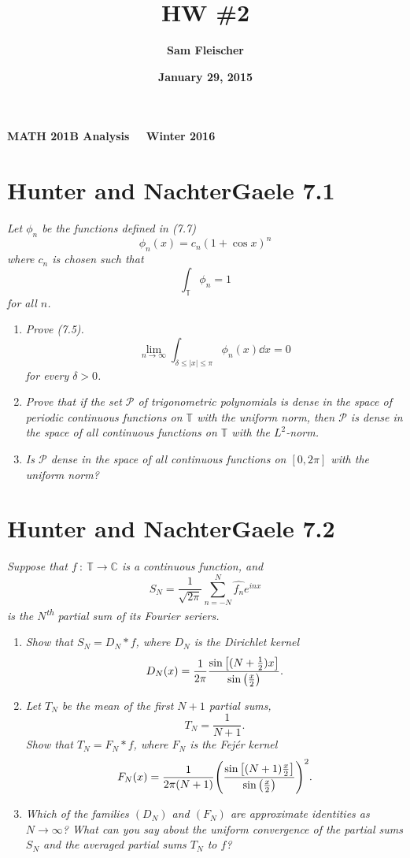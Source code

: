 \documentclass[12pt]{article}
\title{\bf HW \#2}
\author{\bf Sam Fleischer}
\date{\bf January 29, 2015}
\theoremstyle{plain}
\begin{document}
\textbf{MATH 201B \hfill Analysis \ \ \hfill Winter 2016\ \ \ }

{\let\newpage\relax\maketitle}

\section*{Hunter and NachterGaele 7.1}
\emph{Let $\phi_n$ be the functions defined in (7.7) $$\phi_n(x) = c_n(1 + \cos x)^n$$ where $c_n$ is chosen such that $$\int_\mathbb{T}\phi_n = 1$$ for all $n$.}
\begin{enumerate}[ (a)]
    \item
        \emph{Prove (7.5).  $$\lim_{n\rightarrow \infty}\int_{\delta\leq|x|\leq \pi}\phi_n(x) \dd x = 0$$ for every $\delta > 0$.}
    \item
        \emph{Prove that if the set $\mathcal{P}$ of trigonometric polynomials is dense in the space of periodic continuous functions on $\mathbb{T}$ with the uniform norm, then $\mathcal{P}$ is dense in the space of all continuous functions on $\mathbb{T}$ with the $L^2$-norm.}
    \item
        \emph{Is $\mathcal{P}$ dense in the space of all continuous functions on $[0, 2\pi]$ with the uniform norm?}
\end{enumerate}

\section*{Hunter and NachterGaele 7.2}
\emph{Suppose that $f\ :\ \mathbb{T} \rightarrow \mathbb{C}$ is a continuous function, and $$S_N = \frac{1}{\sqrt{2\pi}}\sum_{n=-N}^N \hat{f_n}e^{inx}$$ is the $N$\textsuperscript{th} partial sum of its Fourier seriers.}
\begin{enumerate}[ (a)]
    \item
        \emph{Show that $S_N = D_N * f$, where $D_N$ is the \emph{Dirichlet kernel} $$D_N(x) = \frac{1}{2\pi}\frac{\sin\qty[(N+\frac{1}{2})x]}{\sin \qty(\frac{x}{2})}.$$}
    \item
        \emph{Let $T_N$ be the mean of the first $N+1$ partial sums, $$T_N = \frac{1}{N+1}.$$  Show that $T_N = F_N * f$, where $F_N$ is the \emph{Fej\'{e}r kernel} $$F_N(x) = \frac{1}{2\pi(N + 1)}\qty(\frac{\sin\qty[(N + 1)\frac{x}{2}]}{\sin\qty(\frac{x}{2})})^2.$$}
    \item
        \emph{Which of the families $(D_N)$ and $(F_N)$ are approximate identities as $N\rightarrow \infty$?  What can you say about the uniform convergence of the partial sums $S_N$ and the averaged partial sums $T_N$ to $f$?}
\end{enumerate}
\end{document}
